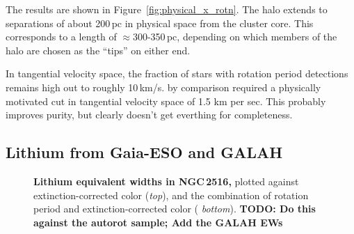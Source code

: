 \documentclass[12pt,twocolumn,tighten]{aastex63}
\begin{document}
The results are shown in Figure~\ref{fig:physical_x_rotn}.
The halo extends to separations of about 200\,pc in physical space
from the cluster core.
This corresponds to a length of $\approx$300-350\,pc, depending on
which members of the halo are chosen as the ``tips'' on either
end.

In tangential velocity space, the fraction of stars with rotation
period detections remains high out to roughly 10\,km/s.
\citet{meingast_2021} by comparison required a physically motivated
cut in tangential velocity space of 1.5 km per sec.  This probably
improves purity, but clearly doesn't get everthing for completeness.



\subsection{Lithium from Gaia-ESO and GALAH}
\label{subsec:lithium}

\begin{figure}[t]
	\begin{center}
		\leavevmode
	
	\end{center}
	\vspace{-0.7cm}
  \caption{ {\bf Lithium equivalent widths in NGC\,2516,}
  plotted against extinction-corrected color ({\it top}), and the
  combination of rotation period and extinction-corrected color ({\it
  bottom}).
  {\bf TODO: Do this against the autorot sample; Add the GALAH EWs}
  \label{fig:lithium}
  }
\end{figure}
\end{document}
